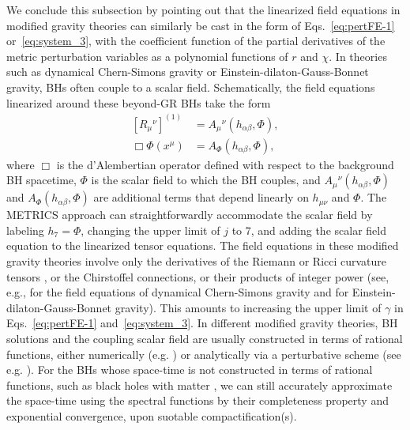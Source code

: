\documentclass[aps,prx,amsmath,floats,floatfix,twocolumn,
  superscriptaddress,nofootinbib,showpacs]{revtex4-1}
\begin{document}
We conclude this subsection by pointing out that the linearized field equations in modified gravity theories can similarly be cast in the form of Eqs.~\eqref{eq:pertFE-1} or~\eqref{eq:system_3}, with the coefficient function of the partial derivatives of the metric perturbation variables as a polynomial functions of $r$ and $\chi$. 
In theories such as dynamical Chern-Simons gravity or Einstein-dilaton-Gauss-Bonnet gravity, BHs often couple to a scalar field. 
Schematically, the field equations linearized around these beyond-GR BHs take the form 
\begin{equation}\label{eq:beyond_GR_linearized_field_equation}
\begin{split}
\left[R_{\mu}{}^{\nu}\right]^{(1)} & = A_{\mu}{}^{\nu} (h_{\alpha \beta}, \Phi), \\
\Box \Phi (x^{\mu}) & = A_{\Phi} (h_{\alpha \beta}, \Phi), 
\end{split}
\end{equation}
where $\Box$ is the d'Alembertian operator defined with respect to the background BH spacetime, $\Phi$ is the scalar field to which the BH couples, and $ A_{\mu}{}^{\nu} (h_{\alpha \beta}, \Phi)$ and $A_{\Phi} (h_{\alpha \beta}, \Phi)$ are additional terms that depend linearly on $h_{\mu \nu}$ and $\Phi$. 
The METRICS approach can straightforwardly accommodate the scalar field by labeling $h_7 = \Phi $, changing the upper limit of $j$ to 7, and adding the scalar field equation to the linearized tensor equations. 
The field equations in these modified gravity theories involve only the derivatives of the Riemann or Ricci curvature tensors , or the Chirstoffel connections, or their products of integer power (see, e.g., \cite{Jackiw:2003pm, Alexander:2009tp, Yunes:2009hc} for the field equations of dynamical Chern-Simons gravity and for \cite{QNM_EdGB_01, QNM_EdGB_02, QNM_EdGB_03} Einstein-dilaton-Gauss-Bonnet gravity). 
This amounts to increasing the upper limit of $\gamma$ in Eqs.~\eqref{eq:pertFE-1} and~\eqref{eq:system_3}. 
In different modified gravity theories, BH solutions and the coupling scalar field are usually constructed in terms of rational functions, either numerically (e.g. \cite{Sullivan:2019vyi, Sullivan:2020zpf, McNees:2015srl}) or analytically via a perturbative scheme (see e.g. \cite{Yunes:2009hc, Maselli:2015tta, Cano_Ruiperez_2019}).
For the BHs whose space-time is not constructed in terms of rational functions, such as black holes with matter \cite{Nampalliwar:2021tyz, Daghigh:2022pcr}, we can still accurately approximate the space-time using the spectral functions by their completeness property and exponential convergence, upon suotable compactification(s). 
\end{document}
